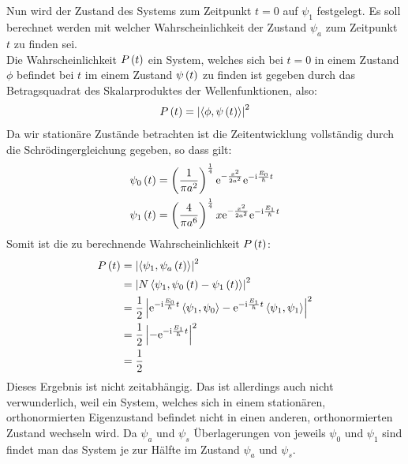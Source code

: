 \documentclass[11pt, ngerman, fleqn, DIV=15, headinclude]{scrartcl}
\begin{document}
\subsection{}

Nun wird der Zustand des Systems zum Zeitpunkt $t=0$ auf $\psi_1$ festgelegt. Es soll berechnet werden mit welcher Wahrscheinlichkeit der Zustand $\psi_a$ zum Zeitpunkt $t$ zu finden sei.\\
Die Wahrscheinlichkeit $P\left( t \right)$ ein System, welches sich bei $t=0$ in einem Zustand $\phi$ befindet bei $t$ im einem Zustand $\psi\left( t \right)$ zu finden ist gegeben durch das Betragsquadrat des Skalarproduktes der Wellenfunktionen, also:
\begin{align*}
	P\left( t \right)=\left| \left<\phi,\psi\left( t \right)\right> \right|^2
\end{align*}
Da wir stationäre Zustände betrachten ist die Zeitentwicklung vollständig durch die Schrödingergleichung gegeben, so dass gilt:
\begin{align*}
	\psi_0\left( t \right)	&= \left( \frac1{\pi a^2} \right)^{\frac14} \mathrm e^{-\frac{x^2}{2a^2}}\mathrm e^{-\mathrm i\frac{E_0}{\hbar}t}\\
	\psi_1\left( t \right)	&= \left( \frac4{\pi a^6} \right)^{\frac14} x \mathrm e^{-\frac{x^2}{2a^2}}\mathrm e^{-\mathrm i\frac{E_1}{\hbar}t}
\end{align*}
Somit ist die zu berechnende Wahrscheinlichkeit $P\left( t \right)$:
\begin{align*}
	P\left( t \right)	&= \left| \left<\psi_1,\psi_a\left( t \right)\right> \right|^2\\
				&= \left| N\left<\psi_1,\psi_0\left( t \right)-\psi_1\left( t \right)\right> \right|^2\\
				&= \frac 12\left| \mathrm e^{-\mathrm i\frac{E_0}{\hbar}t}\left<\psi_1,\psi_0\right> - \mathrm e^{-\mathrm i\frac{E_1}{\hbar}t}\left<\psi_1,\psi_1\right> \right|^2\\
				&= \frac 12\left| -\mathrm e^{-\mathrm i\frac{E_1}{\hbar}t} \right|^2\\
				&= \frac 12
\end{align*}
Dieses Ergebnis ist nicht zeitabhängig. Das ist allerdings auch nicht verwunderlich, weil ein System, welches sich in einem stationären, orthonormierten Eigenzustand befindet nicht in einen anderen, orthonormierten Zustand wechseln wird. Da $\psi_a$ und $\psi_s$ Überlagerungen von jeweils $\psi_0$ und $\psi_1$ sind findet man das System je zur Hälfte im Zustand $\psi_a$ und $\psi_s$.

\subsection{}
\end{document}
